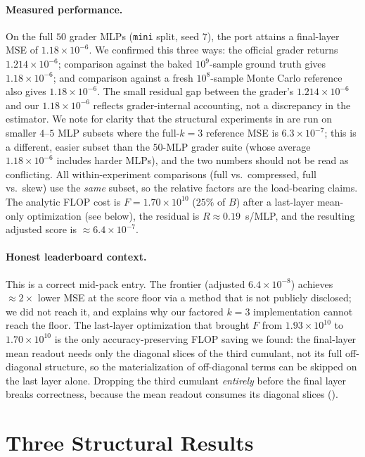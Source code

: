 \documentclass[11pt]{article}
\theoremstyle{remark}
\begin{document}
\paragraph{Measured performance.}
On the full $50$ grader MLPs (\texttt{mini} split, seed $7$), the port attains a
final-layer MSE of $1.18\times10^{-6}$. We confirmed this three ways: the
official grader returns $1.214\times10^{-6}$; comparison against the baked
$10^9$-sample ground truth gives $1.18\times10^{-6}$; and comparison against a
fresh $10^8$-sample Monte Carlo reference also gives $1.18\times10^{-6}$. The
small residual gap between the grader's $1.214\times10^{-6}$ and our
$1.18\times10^{-6}$ reflects grader-internal accounting, not a discrepancy in the
estimator. We note for clarity that the structural experiments in
 are run on smaller $4$--$5$ MLP subsets where the
full-$k{=}3$ reference MSE is $6.3\times10^{-7}$; this is a different, easier
subset than the $50$-MLP grader suite (whose average $1.18\times10^{-6}$
includes harder MLPs), and the two numbers should not be read as conflicting.
All within-experiment comparisons (full vs.\ compressed, full vs.\ skew) use the
\emph{same} subset, so the relative factors are the load-bearing claims. The
analytic FLOP cost is $F=1.70\times10^{10}$ ($25\%$ of $B$) after a last-layer
mean-only optimization (see below), the residual is $R\approx0.19$~s/MLP, and the
resulting adjusted score is $\approx 6.4\times10^{-7}$.

\paragraph{Honest leaderboard context.}
This is a correct mid-pack entry. The frontier (adjusted $6.4\times10^{-8}$)
achieves $\approx2\times$ lower MSE at the score floor via a method that is not
publicly disclosed; we did not reach it, and  explains why our
factored $k{=}3$ implementation cannot reach the floor. The last-layer
optimization that brought $F$ from $1.93\times10^{10}$ to $1.70\times10^{10}$ is
the only accuracy-preserving FLOP saving we found: the final-layer mean readout
needs only the diagonal slices of the third cumulant, not its full off-diagonal
structure, so the materialization of off-diagonal terms can be skipped on the
last layer alone. Dropping the third cumulant \emph{entirely} before the final
layer breaks correctness, because the mean readout consumes its diagonal slices
().

\section{Three Structural Results}
\label{sec:results}
\end{document}
